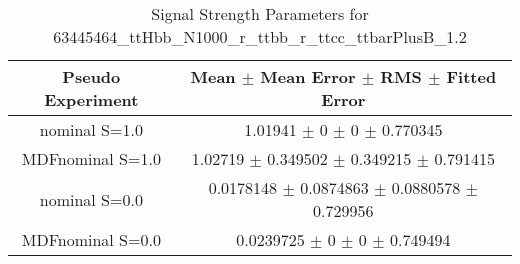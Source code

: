 \begin{table}
\centering
\caption{Signal Strength Parameters for 63445464\_ttHbb\_N1000\_r\_ttbb\_r\_ttcc\_ttbarPlusB\_1.2}
\begin{tabular}{cc}
\toprule
Pseudo Experiment & Mean $\pm$ Mean Error $\pm$ RMS $\pm$ Fitted Error\\
\midrule
nominal S=1.0 & \num{1.01941} $\pm$ \num{0} $\pm$ \num{0} $\pm$ \num{0.770345}\\
MDFnominal S=1.0 & \num{1.02719} $\pm$ \num{0.349502} $\pm$ \num{0.349215} $\pm$ \num{0.791415}\\
nominal S=0.0 & \num{0.0178148} $\pm$ \num{0.0874863} $\pm$ \num{0.0880578} $\pm$ \num{0.729956}\\
MDFnominal S=0.0 & \num{0.0239725} $\pm$ \num{0} $\pm$ \num{0} $\pm$ \num{0.749494}\\
\bottomrule
\end{tabular}
\end{table}